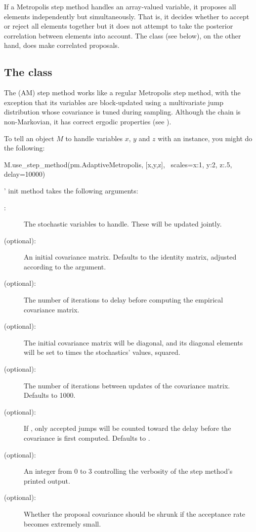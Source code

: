 \documentclass[]{jss}
\begin{document}
If a Metropolis step method handles an array-valued variable, it proposes all elements independently but simultaneously. That is, it decides whether to accept or reject all elements together but it does not attempt to take the posterior correlation between elements into account. The  class (see below), on the other hand, does make correlated proposals.

\subsection[The AdaptiveMetropolis class]{The  class}
\label{subsec:AM}
The  (AM) step method works like a regular Metropolis
step method, with the exception that its variables are block-updated using a
multivariate jump distribution whose covariance is tuned during sampling.
Although the chain is non-Markovian, it has correct ergodic properties (see
\citet{Haario:2001lr}).

To tell an  object $M$ to handle variables $x$, $y$ and $z$ with an
 instance, you might do the following:
\begin{CodeInput}
M.use_step_method(pm.AdaptiveMetropolis, [x,y,z], \
                  scales={x:1, y:2, z:.5}, delay=10000)
\end{CodeInput}

' init method takes the following arguments:
\begin{description}
   \item[:] The stochastic variables to handle. These will be
updated jointly.
   \item[ (optional):] An initial covariance matrix. Defaults to the
identity matrix, adjusted according to the \code{scales} argument.
   \item[\code{delay} (optional):] The number of iterations to delay before
computing the empirical covariance matrix.
   \item[ (optional):] The initial covariance matrix will be
diagonal, and its diagonal elements will be set to \code{scales} times the
stochastics' values, squared.
   \item[ (optional):] The number of iterations between updates
of the covariance matrix. Defaults to 1000.
   \item[ (optional):] If , only accepted jumps will be
counted toward the delay before the covariance is first computed. Defaults to
\code{True}.
   \item[ (optional):] An integer from 0 to 3 controlling the verbosity of
the step method's printed output.
    \item[ (optional):] Whether the proposal covariance should be
shrunk if the acceptance rate becomes extremely small.
\end{description}
\end{document}
